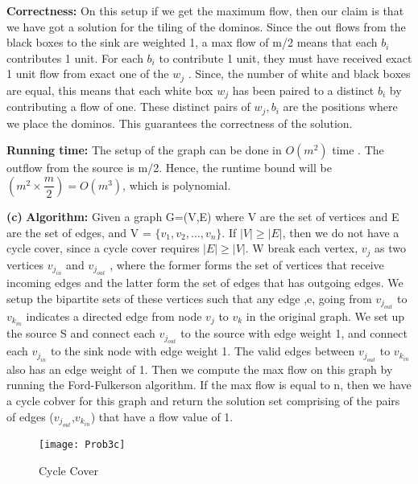 \documentclass{article}
\renewcommand\part[1]{\vspace{.10in}\textbf{(#1)}}
\newcommand\algo{\vspace{.10in}\textbf{Algorithm: }}
\newcommand\correctness{\vspace{.10in}\textbf{Correctness: }}
\newcommand\runtime{\vspace{.10in}\textbf{Running time: }}
\begin{document}
  \correctness On this setup if we get the maximum flow, then our claim is that we have got a solution for the tiling of the dominos. Since the out flows from the black boxes to the sink are weighted 1, a max flow of m/2 means that each $b_i$ contributes 1 unit. For each $b_i$ to contribute 1 unit, they must have received exact 1 unit flow from exact one of the $w_j$ . Since, the number of white and black boxes are equal, this means that each white box $w_{j}$ has been paired to a distinct $b_i$ by contributing a flow of one. These distinct pairs of $w_j,b_i$ are the positions where we place the dominos. This guarantees the correctness of the solution. \newline

  \runtime The setup of the graph can be done in $O(m^2)$ time . The outflow from the source is m/2. Hence, the runtime bound will be $(m^2 \times \dfrac{m}{2}) = O(m^3)$, which is polynomial. 

  \part{c}
  \algo Given a graph G=(V,E) where V are the set of vertices and E are the set of edges, and V = $\{v_1, v_2, \dots, v_n\}$. If $|V| \geq |E|$, then we do not have a cycle cover, since a cycle cover requires $|E|\geq|V|$.  W break each vertex, $v_j$ as two vertices $v_{j_{in}}$ and $v_{j_{out}}$ , where the former forms the set of vertices that receive incoming edges and the latter form the set of edges that has outgoing edges. We setup the bipartite sets of these vertices such that any edge ,e, going from $v_{j_{out}}$ to $v_{k_{in}}$ indicates a directed edge from node $v_j$ to $v_k$ in the original graph. We set up the source S and connect each $v_{j_{out}}$ to the source with edge weight 1, and connect each $v_{j_{in}}$ to the sink node with edge weight 1. The valid edges between $v_{j_{out}}$ to $v_{k_{in}}$ also has an edge weight of 1. Then we compute the max flow on this graph by running the Ford-Fulkerson algorithm. If the max flow is equal to n, then we have a cycle cobver for this graph and return the solution set comprising of the pairs of edges ($v_{j_{out}}$,$v_{k_{in}}$) that have a flow value of 1. \newline

  \begin{figure}[H]
   \centering
  \texttt{[image: Prob3c]}
  \caption{Cycle Cover}
  \end{figure}
\end{document}
